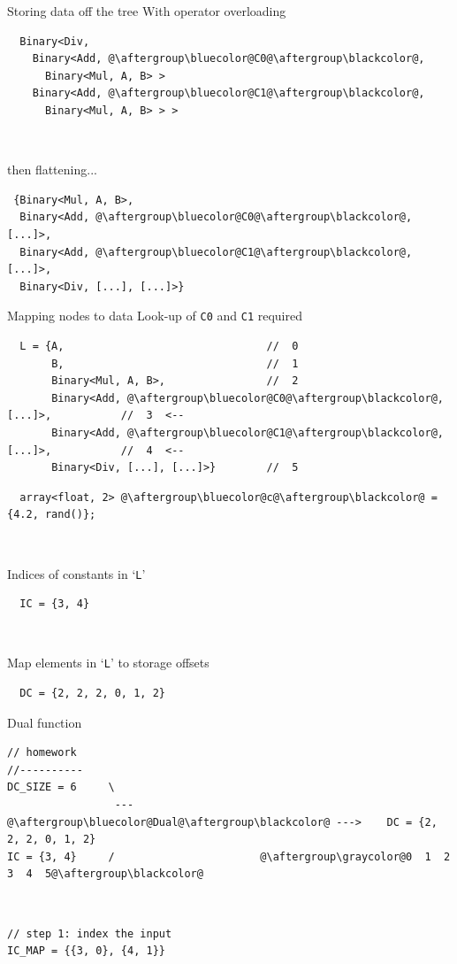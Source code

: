 \documentclass[xcolor=dvipsnames]{beamer}
\begin{document}
\begin{frame}[fragile]{Storing data off the tree}
With operator overloading
\begin{lstlisting}
  Binary<Div,
    Binary<Add, @\aftergroup\bluecolor@C0@\aftergroup\blackcolor@,
      Binary<Mul, A, B> >
    Binary<Add, @\aftergroup\bluecolor@C1@\aftergroup\blackcolor@,
      Binary<Mul, A, B> > >
\end{lstlisting}

~

then flattening...
\begin{lstlisting}
 {Binary<Mul, A, B>,
  Binary<Add, @\aftergroup\bluecolor@C0@\aftergroup\blackcolor@, [...]>,
  Binary<Add, @\aftergroup\bluecolor@C1@\aftergroup\blackcolor@, [...]>,
  Binary<Div, [...], [...]>}
\end{lstlisting}
\end{frame}


\begin{frame}[fragile]{Mapping nodes to data}
Look-up of {\color{blue}\texttt{C0}} and {\color{blue}\texttt{C1}} required
\begin{lstlisting}
  L = {A,                                //  0
       B,                                //  1
       Binary<Mul, A, B>,                //  2
       Binary<Add, @\aftergroup\bluecolor@C0@\aftergroup\blackcolor@, [...]>,           //  3  <--
       Binary<Add, @\aftergroup\bluecolor@C1@\aftergroup\blackcolor@, [...]>,           //  4  <--
       Binary<Div, [...], [...]>}        //  5
\end{lstlisting}
\begin{lstlisting}
  array<float, 2> @\aftergroup\bluecolor@c@\aftergroup\blackcolor@ = {4.2, rand()};
\end{lstlisting}

~

Indices of constants in `\texttt{L}'
\begin{lstlisting}
  IC = {3, 4}
\end{lstlisting}

~

Map elements in `\texttt{L}' to storage offsets
\begin{lstlisting}
  DC = {2, 2, 2, 0, 1, 2}
\end{lstlisting}
\end{frame}


\begin{frame}[fragile]{Dual function}
\begin{lstlisting}
// homework
//----------
DC_SIZE = 6     \
                 --- @\aftergroup\bluecolor@Dual@\aftergroup\blackcolor@ --->    DC = {2, 2, 2, 0, 1, 2}
IC = {3, 4}     /                       @\aftergroup\graycolor@0  1  2  3  4  5@\aftergroup\blackcolor@
\end{lstlisting}

~

\begin{lstlisting}
// step 1: index the input
IC_MAP = {{3, 0}, {4, 1}}
\end{lstlisting}
\end{frame}
\end{document}
